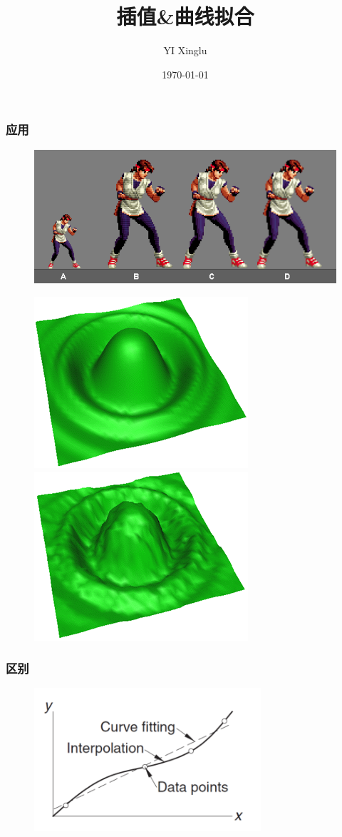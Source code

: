 \documentclass[red,compress]{beamer}
\begin{document}
\title{插值\&曲线拟合}
\author{YI Xinglu}
\date{\today}
\frame{\titlepage}
\begin{frame}
\frametitle{应用}
\begin{figure}
	\includegraphics[width=.4\linewidth]{quanhuang.png}
\end{figure}
\begin{figure}
	\includegraphics[width=.4\linewidth]{weightinterp2.png}
	\includegraphics[width=.4\linewidth]{weightinterp6.png}
\end{figure}
\end{frame}
\begin{frame}
\frametitle{区别}
\begin{figure}
\centering
\includegraphics[width=0.75\textwidth]{int.png}
\end{figure}
\end{frame}
\end{document}
